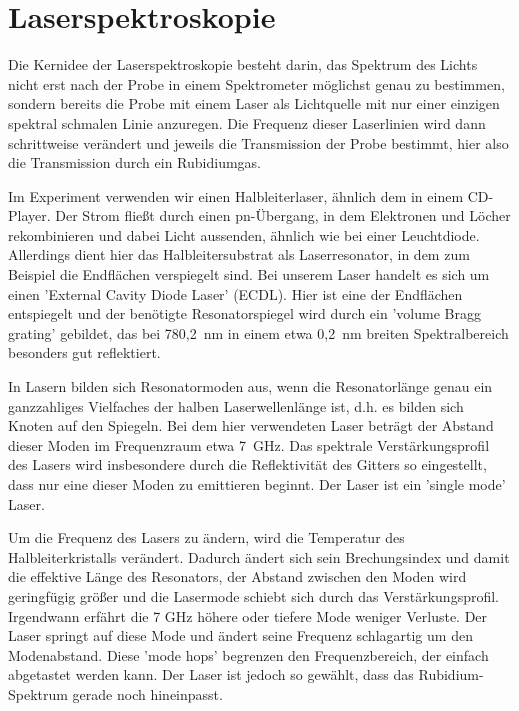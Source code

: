 \section{Laserspektroskopie}

Die Kernidee der Laserspektroskopie besteht darin, das Spektrum des Lichts nicht erst nach der Probe in einem Spektrometer möglichst genau zu bestimmen, sondern bereits die Probe mit einem Laser als Lichtquelle mit nur einer einzigen spektral schmalen Linie anzuregen. Die Frequenz dieser Laserlinien wird dann schrittweise verändert und jeweils die Transmission der Probe bestimmt, hier also die Transmission durch ein Rubidiumgas.

Im Experiment verwenden wir einen Halbleiterlaser, ähnlich dem in einem CD-Player. Der Strom fließt durch einen pn-Übergang, in dem Elektronen und Löcher rekombinieren und dabei Licht aussenden, ähnlich wie bei einer Leuchtdiode. Allerdings dient hier das Halbleitersubstrat als Laserresonator, in dem zum Beispiel die Endflächen verspiegelt sind. Bei unserem Laser handelt es sich um einen 'External Cavity Diode Laser' (ECDL). Hier ist eine der Endflächen entspiegelt und der benötigte Resonatorspiegel wird durch ein 'volume Bragg grating' gebildet, das bei 780,2~nm in einem etwa 0,2~nm breiten Spektralbereich besonders gut reflektiert.

In Lasern bilden sich Resonatormoden aus, wenn die Resonatorlänge genau ein ganzzahliges Vielfaches der halben Laserwellenlänge ist, d.h. es bilden sich Knoten auf den Spiegeln. Bei dem hier verwendeten Laser beträgt der Abstand dieser Moden im Frequenzraum etwa 7~GHz. Das spektrale Verstärkungsprofil des Lasers wird insbesondere durch die Reflektivität des Gitters so eingestellt, dass nur eine dieser Moden zu emittieren beginnt. Der Laser ist ein 'single mode' Laser.

Um die Frequenz des Lasers zu ändern, wird die Temperatur des Halbleiterkristalls verändert. Dadurch ändert sich sein Brechungsindex und damit die effektive Länge des Resonators, der Abstand zwischen den Moden wird geringfügig größer und die Lasermode schiebt sich durch das Verstärkungsprofil. Irgendwann erfährt die 7 GHz höhere oder tiefere Mode weniger Verluste. Der Laser springt auf diese Mode und ändert seine Frequenz schlagartig um den Modenabstand. Diese 'mode hops' begrenzen den Frequenzbereich, der einfach abgetastet werden kann.  Der Laser ist jedoch so gewählt, dass das Rubidium-Spektrum gerade noch hineinpasst.


